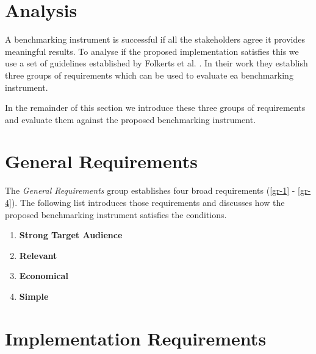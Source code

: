 \section{Analysis}
\label{sec:system:analysis}

A benchmarking instrument is successful if all the stakeholders agree it provides meaningful results. To analyse if the proposed implementation satisfies this we use a set of guidelines established by Folkerts et al. \cite{folkerts2012benchmarking}. In their work they establish three groups of requirements which can be used to evaluate ea benchmarking instrument.

In the remainder of this section we introduce these three groups of requirements and evaluate them against the proposed benchmarking instrument. 

\section{General Requirements}
\label{sec:system:analysis:general}

The \textit{General Requirements} group establishes four broad requirements (\ref{gr-1} - \ref{gr-4}). The following list introduces those requirements and discusses how the proposed benchmarking instrument satisfies the conditions.

\begin{enumerate}[label=\textbf{GR\arabic*}, leftmargin=3\parindent]
    \item \textbf{Strong Target Audience}
    \label{gr-1}
    

    \item \textbf{Relevant}
    \label{gr-2}
    

    \item \textbf{Economical}
    \label{gr-3}
    

    \item \textbf{Simple}
    \label{gr-4}
    
\end{enumerate}


\section{Implementation Requirements}
\label{sec:system:analysis:implementation}

